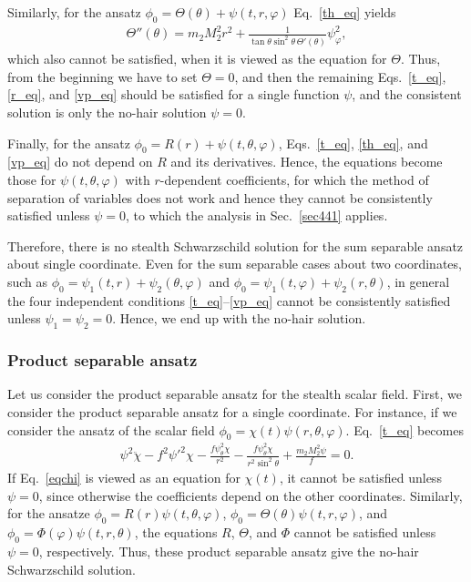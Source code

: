\documentclass[prd,amsmath,amssymb,floatfix,superscriptaddress,notitlepage,nofootinbib,preprintnumbers]{revtex4-1}
\begin{document}
Similarly, 
for the ansatz $\phi_0=\Theta(\theta)+\psi(t,r,\varphi)$ 
Eq.~\eqref{th_eq} yields
\begin{align} 
\label{g2_sum_theta} 
\Theta''(\theta) 
=m_2 M_2^2 r^2+\frac{1}{\tan\theta\sin^2\theta\,\Theta'(\theta)}\psi_\varphi^2,
\end{align}
which also cannot be satisfied,
when it is viewed as the equation for $\Theta$.
Thus, from the beginning we have to set $\Theta=0$,
and then the remaining Eqs.~\eqref{t_eq}, \eqref{r_eq}, and \eqref{vp_eq} 
should be satisfied for a single function $\psi$,
and the consistent solution is only the no-hair solution $\psi=0$.


Finally, 
for the ansatz $\phi_0=R(r)+\psi(t,\theta,\varphi)$,
Eqs.~\eqref{t_eq}, \eqref{th_eq}, and \eqref{vp_eq}
do not depend on $R$ and its derivatives. 
Hence, the equations become those for $\psi(t,\theta,\varphi)$
with $r$-dependent coefficients,
for which the method of separation of variables does not work and hence they
cannot be consistently satisfied 
unless $\psi=0$,
to which the analysis in Sec.~\ref{sec441} applies.


Therefore, there is no stealth Schwarzschild solution for the sum separable ansatz about single coordinate.
Even for the sum separable cases about two coordinates, 
such as 
$\phi_0=\psi_1(t,r)+\psi_2(\theta,\varphi)$
and 
$\phi_0=\psi_1(t,\varphi)+\psi_2(r,\theta)$,
in general the four independent conditions \eqref{t_eq}--\eqref{vp_eq}
cannot be consistently satisfied
unless $\psi_1=\psi_2=0$.
Hence, we end up with the
no-hair solution. 


\subsubsection{Product separable ansatz}
\label{sec532}

Let us consider the product separable ansatz for the stealth scalar field.
First, we consider the product separable ansatz for a single coordinate. 
For instance,
if we consider the ansatz of the scalar field $\phi_0=\chi(t)\psi (r,\theta,\varphi)$.
Eq.~\eqref{t_eq} becomes
\begin{align}
\label{eqchi}
\psi^2\ddot{\chi}
-f^2\psi'^2 \chi
-\frac{f\psi_\theta^2\chi}{r^2}
-\frac{f\psi_\theta^2\chi}{r^2\sin^2\theta}
+\frac{m_2M_2^2\psi}{f}
=0.
\end{align}
If Eq.~\eqref{eqchi} is viewed as an equation for $\chi(t)$,
it cannot be satisfied unless $\psi=0$,
since otherwise the coefficients depend on the other coordinates.
Similarly, for the ansatze 
$\phi_0=R(r)\psi (t,\theta,\varphi)$,
$\phi_0=\Theta(\theta)\psi (t,r,\varphi)$,
and 
$\phi_0=\Phi(\varphi)\psi (t,r,\theta)$,
the equations $R$, $\Theta$, and $\Phi$
cannot be satisfied unless $\psi=0$, respectively.
Thus, these product separable ansatz give the no-hair Schwarzschild solution.
\end{document}
